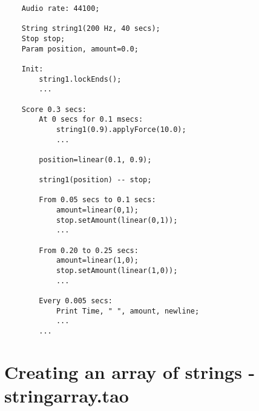 \begin{verbatim}
    Audio rate: 44100;
        
    String string1(200 Hz, 40 secs);
    Stop stop;    
    Param position, amount=0.0;
        
    Init:
        string1.lockEnds();
        ...
            
    Score 0.3 secs:
        At 0 secs for 0.1 msecs:
            string1(0.9).applyForce(10.0);
            ...
        
        position=linear(0.1, 0.9);
        	
        string1(position) -- stop;
        
        From 0.05 secs to 0.1 secs:
            amount=linear(0,1);
            stop.setAmount(linear(0,1));
            ...
        
        From 0.20 to 0.25 secs:
            amount=linear(1,0);
            stop.setAmount(linear(1,0));
            ...
        
        Every 0.005 secs:
            Print Time, " ", amount, newline;
            ...
        ...
\end{verbatim}
 
\section{Creating an array of strings - stringarray.tao}

